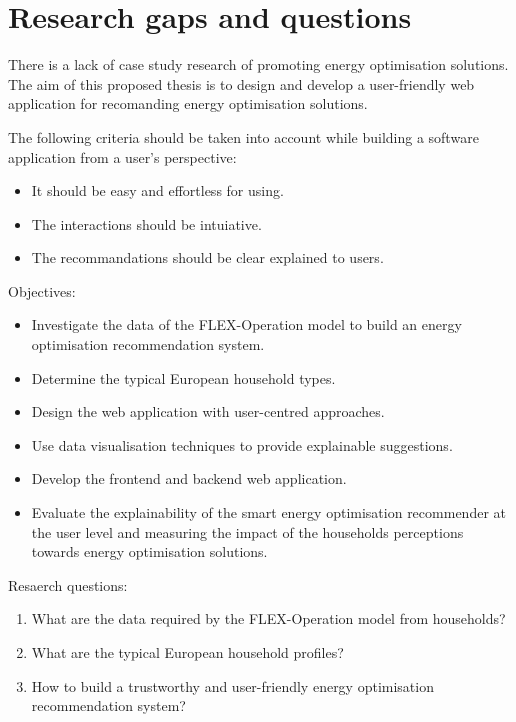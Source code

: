 \section{Research gaps and questions}

There is a lack of case study research of promoting energy optimisation solutions. 
The aim of this proposed thesis is to design and develop a user-friendly web application for recomanding energy optimisation solutions.

The following criteria should be taken into account while building a software application from a user's perspective: 

\begin{itemize}
  \item It should be easy and effortless for using. 
  \item The interactions should be intuiative. 
  \item The recommandations should be clear explained to users. 
\end{itemize}

Objectives: 

\begin{itemize}
  \item Investigate the data of the FLEX-Operation model to build an energy optimisation recommendation system.
  \item Determine the typical European household types. 
  \item Design the web application with user-centred approaches. 
  \item Use data visualisation techniques to provide explainable suggestions. 
  \item Develop the frontend and backend web application. 
  \item Evaluate the explainability of the smart energy optimisation recommender at the user level and measuring the impact of the households perceptions towards energy optimisation solutions. 
\end{itemize}

Resaerch questions:

\begin{enumerate}
  \item What are the data required by the FLEX-Operation model from households? 
  \item What are the typical European household profiles? 
  \item How to build a trustworthy and user-friendly energy optimisation recommendation system? 
\end{enumerate}

